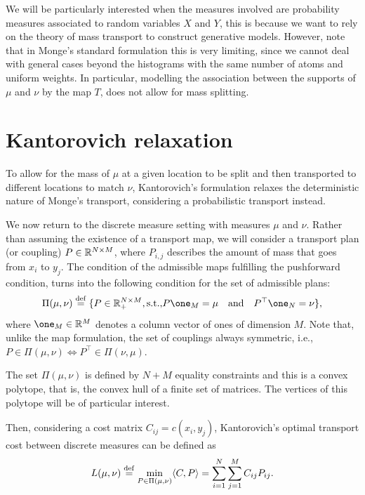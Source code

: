 We will be particularly interested when the measures involved are probability measures associated to random variables $X$ and $Y$, this is because we want to rely on the theory of mass transport to construct generative models. However, note that in Monge's standard formulation this is very limiting, since we cannot deal with general cases beyond the histograms with the same number of atoms and uniform weights. In particular, modelling the association between the supports of $\mu$ and $\nu$ by the map $T$, does not allow for mass splitting. 


\section{Kantorovich relaxation}

To allow for the mass of $\mu$ at a given location to be split and then transported to different locations to match $\nu$, Kantorovich's formulation relaxes the deterministic nature of Monge's transport, considering a probabilistic transport instead.

We now return to the discrete measure setting with measures $\mu$ and $\nu$. Rather than assuming the existence of a transport map, we will consider a transport plan (or coupling) $P\in{\mathbb R}^{N\times M}$, where $P_{i,j}$ describes the amount of mass that goes from $x_i$ to $y_j$. The condition of the admissible maps fulfilling the pushforward condition, turns into the following condition for the set of admissible plans: 
\begin{equation}
    \Pi(\mu,\nu) \defeq \{ P\in\R_+^{N\times M}, \text{s.t.,} P\one_M = \mu\quad \text{and}\quad P^\top\one_N = \nu  \},
\end{equation}
where $\one_M\in\R^M$ denotes a column vector of ones of dimension $M$. 
Note that, unlike the map formulation, the set of couplings always symmetric, i.e., $P\in\Pi(\mu,\nu) \iff P^\top\in\Pi(\nu, \mu)$.

\begin{remark}
    The set $\Pi(\mu,\nu)$ is defined by $N+M$ equality constraints and this is a convex polytope, that is, the convex hull of a finite set of matrices. The vertices of this polytope will be of particular interest.  
\end{remark}

Then, considering a cost matrix $C_{ij} = c(x_i,y_j)$, Kantorovich's optimal transport cost between discrete measures can be defined as 
\begin{equation}\label{eq:kantorovich_discrete}
    L(\mu,\nu) \mathrel{\stackrel{\mathrm{def}}{=}} \min_{P\in\Pi(\mu,\nu)}
 \langle C,P\rangle = \sum_{i=1}^{N}\sum_{j=1}^{M} C_{ij}P_{ij}.
\end{equation}

